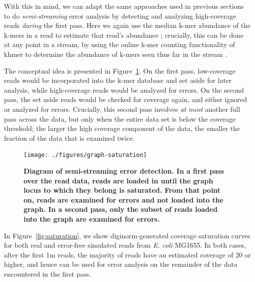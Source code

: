 \documentclass{article}
\begin{document}
With this in mind, we can adapt the same approaches used in previous
sections to do {\em semi-streaming} error analysis by detecting and
analyzing high-coverage reads {\em during} the first pass.  Here we
again use the median k-mer abundance of the k-mers in a read to
estimate that read's abundance \cite{Brown2012}; crucially, this can
be done at any point in a stream, by using the online k-mer counting
functionality of khmer to determine the abundance of k-mers seen thus
far in the stream \cite{Zhang2014}.

The conceptual idea is presented in Figure~\ref{fig:concept}.  On the
first pass, low-coverage reads would be incorporated into the k-mer
database and set aside for later analysis, while high-coverage reads
would be analyzed for errors. On the second pass, the set aside reads
would be checked for coverage again, and either ignored or analyzed
for errors.  Crucially, this second pass involves {\em at most}
another full pass across the data, but only when the entire data set
is below the coverage threshold; the larger the high coverage
component of the data, the smaller the fraction of the data that is
examined twice.

\begin{figure}[!ht]
 \centerline{\texttt{[image: ./figures/graph-saturation]}}
\caption{\bf Diagram of semi-streaming error detection. In a first pass
over the read data, reads are loaded in until the graph locus to which
they belong is saturated.  From that point on, reads are examined for
errors and not loaded into the graph.  In a second pass, only the subset
of reads loaded into the graph are examined for errors.}
\label{fig:concept}
\end{figure}

In Figure~\ref{fig:saturation}, we show diginorm-generated coverage
saturation curves for both real and error-free simulated reads from
{\em E. coli} MG1655.  In both cases, after the first 1m reads, the
majority of reads have an estimated coverage of 20 or higher, and
hence can be used for error analysis on the remainder of the data
encountered in the first pass.
\end{document}
